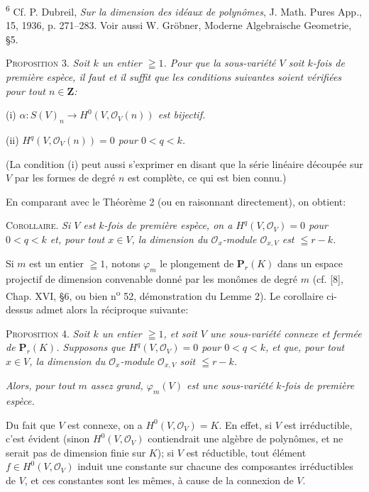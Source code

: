 \textsuperscript{6} Cf. P. Dubreil, \textit{Sur la dimension des idéaux de polynômes}, J. Math. Pures App., 15, 1936, p. 271--283. Voir aussi W. Gröbner, Moderne Algebraische Geometrie, \S5.



\textsc{Proposition} 3. \textit{Soit $k$ un entier $\geqq 1$. Pour que la sous-variété $V$ soit $k$-fois de première espèce, il faut et il suffit que les conditions suivantes soient vérifiées pour tout $n \in \mathbf{Z}$:}

(i) \textit{$\alpha : S(V)_n \to H^0(V, \mathcal{O}_V(n))$ est bijectif.}

(ii) \textit{$H^q(V, \mathcal{O}_V(n)) = 0$ pour $0 < q < k$.}

(La condition (i) peut aussi s'exprimer en disant que la série linéaire découpée sur $V$ par les formes de degré $n$ est complète, ce qui est bien connu.)

En comparant avec le Théorème 2 (ou en raisonnant directement), on obtient:

\textsc{Corollaire}. \textit{Si $V$ est $k$-fois de première espèce, on a $H^q(V, \mathcal{O}_V) = 0$ pour $0 < q < k$ et, pour tout $x \in V$, la dimension du $\mathcal{O}_x$-module $\mathcal{O}_{x,V}$ est $\leqq r - k$.}

Si $m$ est un entier $\geqq 1$, notons $\varphi_m$ le plongement de $\mathbf{P}_r(K)$ dans un espace projectif de dimension convenable donné par les monômes de degré $m$ (cf. [8], Chap. XVI, \S6, ou bien n\textsuperscript{o} 52, démonstration du Lemme 2). Le corollaire ci-dessus admet alors la réciproque suivante:

\textsc{Proposition} 4. \textit{Soit $k$ un entier $\geqq 1$, et soit $V$ une sous-variété connexe et fermée de $\mathbf{P}_r(K)$. Supposons que $H^q(V, \mathcal{O}_V) = 0$ pour $0 < q < k$, et que, pour tout $x \in V$, la dimension du $\mathcal{O}_x$-module $\mathcal{O}_{x,V}$ soit $\leqq r - k$.}

\textit{Alors, pour tout $m$ assez grand, $\varphi_m(V)$ est une sous-variété $k$-fois de première espèce.}

Du fait que $V$ est connexe, on a $H^0(V, \mathcal{O}_V) = K$. En effet, si $V$ est irréductible, c'est évident (sinon $H^0(V, \mathcal{O}_V)$ contiendrait une algèbre de polynômes, et ne serait pas de dimension finie sur $K$); si $V$ est réductible, tout élément $f \in H^0(V, \mathcal{O}_V)$ induit une constante sur chacune des composantes irréductibles de $V$, et ces constantes sont les mêmes, à cause de la connexion de $V$.

